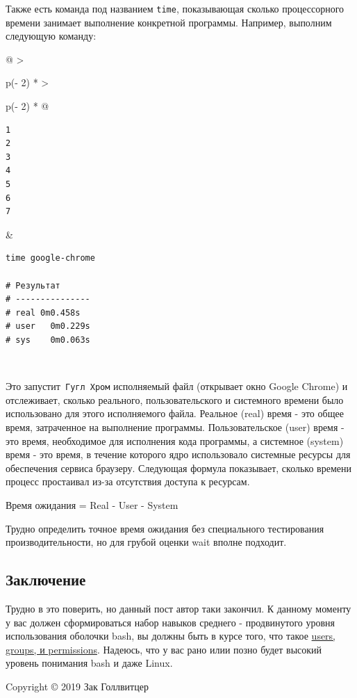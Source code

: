 \documentclass{article}
\begin{document}
Также есть команда под названием \texttt{time}, показывающая сколько
процессорного времени занимает выполнение конкретной программы.
Например, выполним следующую команду:

\begin{longtable}[]{@{}
  >{\raggedright\arraybackslash}p{(\columnwidth - 2\tabcolsep) * }
  >{\raggedright\arraybackslash}p{(\columnwidth - 2\tabcolsep) * }@{}}
\toprule
\endhead
\begin{minipage}[t]{\linewidth}\raggedright
\begin{verbatim}
1
2
3
4
5
6
7
\end{verbatim}
\end{minipage} & \begin{minipage}[t]{\linewidth}\raggedright
\begin{verbatim}
time google-chrome

# Результат
# ---------------
# real 0m0.458s
# user   0m0.229s
# sys    0m0.063s
\end{verbatim}
\end{minipage} \\ \addlinespace
\bottomrule
\end{longtable}

Это запустит\texttt{\ Гугл\ Хром} исполняемый файл (открывает окно
Google Chrome) и отслеживает, сколько реального, пользовательского и
системного времени было использовано для этого исполняемого файла.
Реальное (real) время - это общее время, затраченное на выполнение
программы. Пользовательское (user) время - это время, необходимое для
исполнения кода программы, а системное (system) время - это время, в
течение которого ядро использовало системные ресурсы для обеспечения
сервиса браузеру. Следующая формула показывает, сколько времени процесс
простаивал из-за отсутствия доступа к ресурсам.

Время ожидания = Real - User - System

Трудно определить точное время ожидания без специального тестирования
производительности, но для грубой оценки wait вполне подходит.

\hypertarget{Conclusion}{%
\subsection{\texorpdfstring{\protect\hyperlink{Conclusion}{}Заключение}{Заключение}}\label{Conclusion}}

Трудно в это поверить, но данный пост автор таки закончил. К данному
моменту у вас должен сформироваться набор навыков среднего -
продвинутого уровня использования оболочки bash, вы должны быть в курсе
того, что такое \href{blog/2019/user-permissions/}{users, groups, и
permissions}. Надеюсь, что у вас рано илии позно будет высокий уровень
понимания bash и даже Linux.

Copyright © 2019 Зак Голлвитцер
\end{document}

